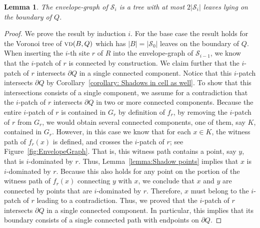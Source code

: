 \documentclass[a4paper, 11pt]{article}
\newtheorem{lemma}[theorem]{Lemma}
\newcommand{\icell}[1][i]{${#1}$-patch\xspace}
\newcommand{\idom}[1][i]{${#1}$-dominated\xspace}
\newcommand{\s}{\mathcal S}
\newcommand{\vd}[2][P]{\textsc{vd}(#2, #1)}
\begin{document}
\begin{lemma}\label{lemma:Structure of the envelope}
The envelope-graph of $\s_i$ is a tree with at most $2|\s_i|$ leaves lying on the boundary of $Q$.
\end{lemma}
\begin{proof}
We prove the result by induction $i$. For the base case the result holds for the Voronoi tree of $\vd[Q]{B}$ which has $|B| = |\s_0|$ leaves on the boundary of $Q$.
When inserting the $i$-th site $r$ of $R$ into the envelope-graph of $\s_{i-1}$, we know that the \icell of $r$ is connected by construction.
We claim further that the \icell of $r$ intersects $\partial Q$ in a single connected component.
Notice that this \icell intersects $\partial Q$ by Corollary~\ref{corollary: Shadows in cell as well}.
To show that this intersections consists of a single component, we assume for a contradiction that the \icell of $r$ intersects $\partial Q$ in two or more connected components. 
Because the entire \icell of $r$ is contained in $G_r$ by definition of $f_r$,  by removing the \icell of $r$ from $G_r$, we would obtain several connected components, one of them, say $K$, contained in $G_r$. However, in this case we know that for each $x\in K$, the witness path of $f_r(x)$ is defined, and crosses the \icell of $r$; see Figure~\ref{fig:EnvelopeGraph}. 
That is, this witness path contains a point, say $y$, that is \idom by $r$. 
Thus, Lemma~\ref{lemma:Shadow points} implies that $x$ is \idom by $r$. 
Because this also holds for any point on the portion of the witness path of $f_r(x)$ connecting $y$ with $x$, 
we conclude that $x$ and $y$ are connected by points that are \idom by $r$. 
Therefore, $x$ must belong to the \icell of $r$ leading to a contradiction. 
Thus, we proved that the \icell of $r$ intersects $\partial Q$ in a single connected component. 
In particular, this implies that its boundary consists of a single connected path with endpoints on $\partial Q$.


\end{proof}
\end{document}
